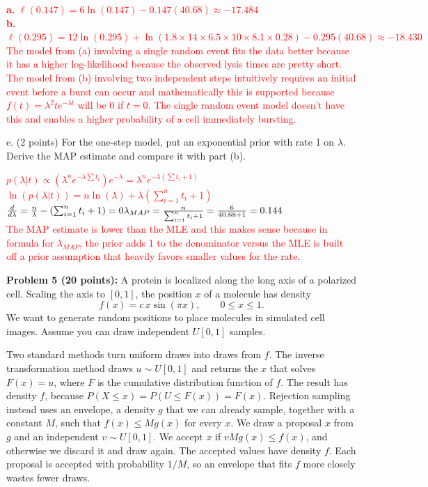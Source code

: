 \documentclass[11pt]{article}
\begin{document}
\textcolor{red}{
\textbf{a.} $\ell(0.147) = 6 \ln(0.147) - 0.147(40.68) \approx -17.484$\\
\textbf{b.} $\ell(0.295) = 12 \ln(0.295) + \ln(1.8 \times 14 \times 6.5 \times 10 \times 8.1 \times 0.28) - 0.295(40.68) \approx -18.430$\\
The model from (a) involving a single random event fits the data better because it has a higher log-likelihood because the observed lysis times are pretty short. The model from (b) involving two independent steps intuitively requires an initial event before a burst can occur and mathematically this is supported because $f(t) = \lambda^2 t e^{-\lambda t}$ will be $0$ if $t=0$. The single random event model doesn't have this and enables a higher probability of a cell immediately bursting.
}

e. (2 points) For the one-step model, put an exponential prior with rate 1 on $\lambda$.  Derive the MAP estimate and compare it with part (b).

\textcolor{red}{
$p(\lambda | t) \propto \left( \lambda^n e^{-\lambda \sum t_i} \right) e^{-\lambda} = \lambda^n e^{-\lambda (\sum t_i + 1)}$\\
$\ln(p(\lambda | t)) = n\ln(\lambda) + \lambda (\sum_{i=1}^n t_i + 1)$\\
$\frac{d}{d\lambda} = \frac{n}{\lambda} - \left(\sum_{i=1}^n t_i + 1\right) = 0\\
\lambda_{MAP} = \frac{n}{\sum_{i=1}^n t_i + 1} = \frac{6}{40.68 + 1} = 0.144$\\
The MAP estimate is lower than the MLE and this makes sense because in formula for $\lambda_{MAP}$, the prior adds 1 to the denominator versus the MLE is built off a prior assumption that heavily favors smaller values for the rate.
}

{\bf Problem 5 (20 points):} A protein is localized along the long axis of a polarized cell.  Scaling the axis to $[0,1]$, the position $x$ of a molecule has density
\[
f(x)=c\,x\sin(\pi x),\qquad 0\le x\le1.
\]
We want to generate random positions to place molecules in simulated cell images.  Assume you can draw independent $U[0,1]$ samples.

Two standard methods turn uniform draws into draws from $f$.  The inverse transformation method draws $u\sim U[0,1]$ and returns the $x$ that solves $F(x)=u$, where $F$ is the cumulative distribution function of $f$.  The result has density $f$, because $P(X\le x)=P(U\le F(x))=F(x)$.  Rejection sampling instead uses an envelope, a density $g$ that we can already sample, together with a constant $M$, such that $f(x)\le Mg(x)$ for every $x$.  We draw a proposal $x$ from $g$ and an independent $v\sim U[0,1]$.  We accept $x$ if $vMg(x)\le f(x)$, and otherwise we discard it and draw again.  The accepted values have density $f$.  Each proposal is accepted with probability $1/M$, so an envelope that fits $f$ more closely wastes fewer draws.
\end{document}
